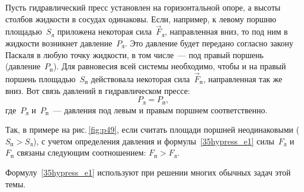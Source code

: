 \documentclass[main.tex]{subfiles}
\begin{document}

Пусть гидравлический пресс установлен на горизонтальной опоре, а высоты столбов жидкости в сосудах одинаковы. Если, например, к левому поршню площадью~$S_\text{л}$ приложена некоторая сила~$\vec F_\text{л}$, направленная вниз, то под ним в жидкости возникнет давление~$P_\text{л}$. Это давление будет передано согласно закону Паскаля в любую точку жидкости, в том числе~--- под правый поршень (давление~$P_\text{п}$). Для равновесия всей системы необходимо, чтобы и на правый поршень площадью~$S_\text{п}$ действовала некоторая сила~$\vec F_\text{п}$, направленная так же вниз. Вот связь давлений в гидравлическом прессе:
\begin{equation}\label{35hypress_e1}
    P_\text{л}=P_\text{п},
\end{equation}
где~$P_\text{л}$ и~$P_\text{п}$~--- давления под левым и правым поршнем соответственно.

Так, в примере на рис.\,\ref{fig:p49}, если считать площади поршней неодинаковыми ($S_\text{п}>S_\text{л}$), с учетом определения давления и формулы~\eqref{35hypress_e1} силы~$F_\text{л}$ и~$F_\text{п}$ связаны следующим соотношением: $F_\text{п}>F_\text{л}$.

Формулу~\eqref{35hypress_e1} используют при решении многих обычных задач этой темы. 

\medskip

\end{document}
